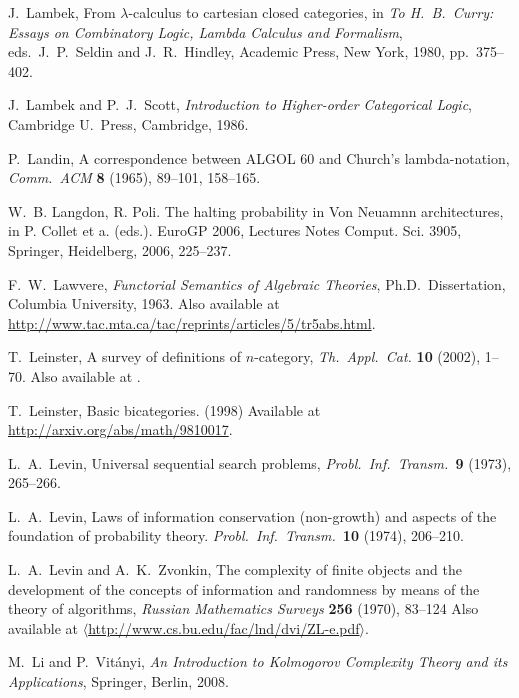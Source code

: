\documentclass[12pt,twoside,openright]{report}
\begin{document}
\begin{thebibliography}{99}
 J.\ Lambek, From $\lambda$-calculus to cartesian closed categories, in {\sl To H.\ B.\ Curry: Essays on Combinatory Logic, Lambda Calculus and Formalism}, eds.\ J.\ P.\ Seldin and J.\
R.\ Hindley, Academic Press, New York, 1980, pp.\ 375--402. 

 J.\ Lambek and P.\ J.\ Scott, {\sl Introduction to Higher-order Categorical Logic}, Cambridge U.\ Press, Cambridge,
1986.  

 P.\ Landin, A correspondence between ALGOL 60 and Church's lambda-notation, {\sl Comm.\ ACM} {\bf 8} (1965), 89--101,
158--165.

 W.~B. Langdon, R. Poli. The halting probability in Von Neuamnn architectures, in P. Collet et a. (eds.). EuroGP 2006, Lectures Notes Comput. Sci. 3905, Springer, Heidelberg, 2006, 225--237.

 F.\ W.\ Lawvere, {\sl Functorial Semantics of Algebraic Theories}, Ph.D.\ Dissertation, Columbia University, 1963. Also available at 
\href{http://www.tac.mta.ca/tac/reprints/articles/5/tr5abs.html}
{http://www.tac.mta.ca/tac/reprints/articles/5/tr5abs.html}.

T.\ Leinster, A survey of definitions of $n$-category,
\textsl{Th.\ Appl.\ Cat.} \textbf{10} (2002), 1--70. Also available at .

 T.\ Leinster, Basic bicategories. (1998)  Available at \href{http://arxiv.org/abs/math/9810017}{http://arxiv.org/abs/math/9810017}.

 L.\ A.\ Levin, Universal sequential search problems, \textit{Probl.\ Inf.\ Transm.\ }\textbf{9}
(1973), 265--266.

 L.\ A.\ Levin, Laws of information conservation
(non-growth) and aspects of the foundation of probability theory.
\textit{Probl.\ Inf.\ Transm.\ }\textbf{10} (1974),
206--210.

 L.\ A.\ Levin and A.\ K.\ Zvonkin, The complexity of finite objects and the development of the concepts of information and randomness by means of the theory of algorithms, 
\textsl{Russian Mathematics Surveys} {\bf 256} (1970), 83--124
Also available at \href{http://www.cs.bu.edu/fac/lnd/dvi/ZL-e.pdf}
{$\langle$http://www.cs.bu.edu/fac/lnd/dvi/ZL-e.pdf$\rangle$}.

 M.\ Li and P.\ Vit\'anyi, \textsl{An Introduction to Kolmogorov Complexity Theory and its Applications}, Springer, Berlin, 2008.


\end{thebibliography}
\end{document}
